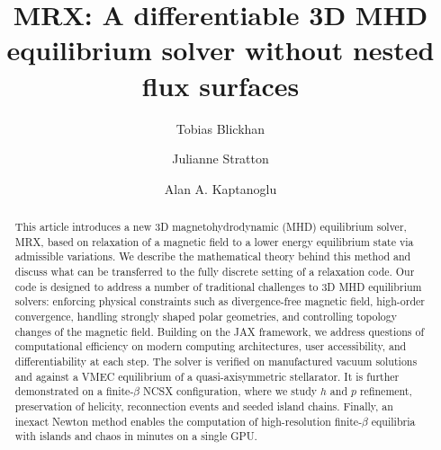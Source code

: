 \documentclass[%
 reprint,
 superscriptaddress,
 amsmath,amssymb,
 aps, nofootinbib, floatfix]{revtex4-2}
\begin{document}
\title{MRX: A differentiable 3D MHD equilibrium solver without nested flux surfaces}

\author{Tobias Blickhan}

\author{Julianne Stratton}

\author{Alan A. Kaptanoglu}

\begin{abstract}
    This article introduces a new 3D magnetohydrodynamic (MHD) equilibrium solver, MRX, based on relaxation of a magnetic field to a lower energy equilibrium state via admissible variations. We describe the mathematical theory behind this method and discuss what can be transferred to the fully discrete setting of a relaxation code. Our code is designed to address a number of traditional challenges to 3D MHD equilibrium solvers: enforcing physical constraints such as divergence-free magnetic field, high-order convergence, handling strongly shaped polar geometries, and controlling topology changes of the magnetic field. Building on the JAX framework, we address questions of computational efficiency on modern computing architectures, user accessibility, and differentiability at each step. The solver is verified on manufactured vacuum solutions and against a VMEC equilibrium of a quasi-axisymmetric stellarator.
    It is further demonstrated on a finite-$\beta$ NCSX configuration, where we study $h$ and $p$ refinement, preservation of helicity, reconnection events and seeded island chains. 
    Finally, an inexact Newton method enables the computation of high-resolution finite-$\beta$ equilibria with islands and chaos in minutes on a single GPU.
\end{abstract}

\maketitle
\end{document}
